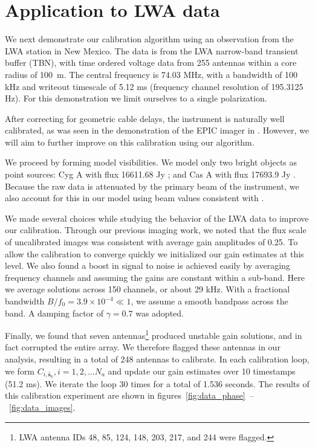 \documentclass[a4paper,fleqn,usenatbib]{../mnras}
\begin{document}
\section{Application to LWA data}\label{sec:data}
We next demonstrate our calibration algorithm using an observation from the LWA station in New Mexico. The data is from the LWA narrow-band transient buffer (TBN), with time ordered voltage data from 255 antennas within a core radius of 100~m. The central frequency is 74.03 MHz, with a bandwidth of 100 kHz and writeout timescale of 5.12 ms (frequency channel resolution of 195.3125 Hz). For this demonstration we limit ourselves to a single polarization.

After correcting for geometric cable delays, the instrument is naturally well calibrated, as was seen in the demonstration of the EPIC imager in \citealt{thy15c}. However, we will aim to further improve on this calibration using our algorithm.

We proceed by forming model visibilities. We model only two bright objects as point sources: Cyg A with flux 16611.68 Jy \citep{coh07}; and Cas A with flux 17693.9 Jy \citep{kas07}. Because the raw data is attenuated by the primary beam of the instrument, we also account for this in our model using beam values consistent with \cite{hic12}.

We made several choices while studying the behavior of the LWA data to improve our calibration. Through our previous imaging work, we noted that the flux scale of uncalibrated images was consistent with average gain amplitudes of 0.25. To allow the calibration to converge quickly we initialized our gain estimates at this level. We also found a boost in signal to noise is achieved easily by averaging frequency channels and assuming the gains are constant within a sub-band. Here we average solutions across 150 channels, or about 29 kHz. With a fractional bandwidth $B/f_0 = 3.9 \times 10^{-4} \ll 1$, we assume a smooth bandpass across the band. 
A damping factor of $\gamma = 0.7$ was adopted.

Finally, we found that seven antennas\footnote{LWA antenna IDs 48, 85, 124, 148, 203, 217, and 244 were flagged.} produced unstable gain solutions, and in fact corrupted the entire array. We therefore flagged these antennas in our analysis, resulting in a total of 248 antennas to calibrate. In each calibration loop, we form $C_{i,\hat{\boldsymbol{s}}_0}, i=1,2,\ldots N_a$ and update our gain estimates over 10 timestamps (51.2 ms). We iterate the loop 30 times for a total of 1.536 seconds. The results of this calibration experiment are shown in figures~\ref{fig:data_phase}~--~\ref{fig:data_images}.
\end{document}
